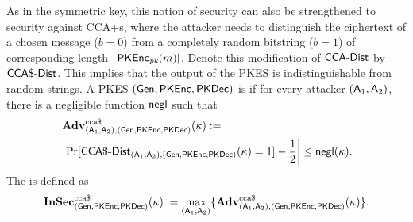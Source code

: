 As in the symmetric key, this notion of security can also be
strengthened to security against \acfp{CCA+}, where the attacker needs
to distinguish the ciphertext of a chosen message ($b=0$) from a
completely random bitstring ($b=1$) of corresponding length
$|\operatorname{\mathsf{PKEnc}}_{\textit{pk}}(m)|$. Denote this modification of $\CCA-Dist$ by
$\CCAD-Dist$. This
implies that the output of the \ac{PKES} is indistinguishable from
random strings. A \ac{PKES} $(\operatorname{\mathsf{Gen}},\operatorname{\mathsf{PKEnc}},\operatorname{\mathsf{PKDec}})$ is
 if for every attacker $(\operatorname{\mathsf{A}}_{1},\operatorname{\mathsf{A}}_{2})$,
there is a negligible function $\operatorname{\mathsf{negl}}$ such that
\begin{align*}
  &\Adv_{(\Att_{1},\Att_{2}),(\Gen,\PKEnc,\PKDec)}^{\ccad}(\kappa) :=\\
  &\left|\Pr[\CCAD-Dist_{(\Att_{1},\Att_{2}),(\Gen,\PKEnc,\PKDec)}(\kappa)=1]-\frac{1}{2}\right|\leq
    \negl(\kappa).
\end{align*}
The  is defined as
\begin{align*}
  \InSec_{(\Gen,\PKEnc,\PKDec)}^{\ccad}(\kappa) := \max_{(\Att_{1},\Att_{2})}\{\Adv^{\ccad}_{(\Att_{1},\Att_{2}),(\Gen,\PKEnc,\PKDec)}(\kappa)\}.
\end{align*}


